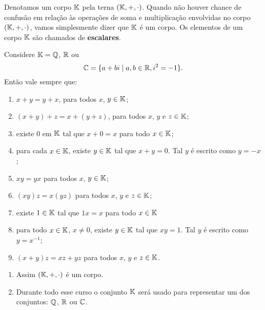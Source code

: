 \documentclass{beamer}
\begin{document}
    \begin{frame}
        Denotamos um corpo $\mathbb{K}$ pela terna $(\mathbb{K}, +, \cdot)$. Quando n\~ao houver chance de confus\~ao em rela\c{c}\~ao \`as opera\c{c}\~oes de soma e multiplica\c{c}\~ao envolvidas no corpo $(\mathbb{K}, +, \cdot)$, vamos simplesmente dizer que $\mathbb{K}$ \'e um corpo. Os elementos de um corpo $\mathbb{K}$ s\~ao chamados de \textbf{escalares}.
    \end{frame}
    
    \begin{frame}
    
        Considere $\mathbb{K} = \mathbb{Q}$, $\mathbb{R}$ ou
        \[
    	    \mathbb{C} = \{a + bi \mid a, b \in \mathbb{R}, i^2 = -1\}.
        \]
        Então vale sempre que:

        \begin{enumerate}[label={\roman*})]
	    \item $x + y = y + x$, para todos $x$, $y \in \mathbb{K}$;
            \item $(x + y) + z = x + (y + z)$, para todos $x$, $y$ e $z \in \mathbb{K}$;
            \item existe $0$ em $\mathbb{K}$ tal que $x + 0 = x$ para todo $x \in \mathbb{K}$;
            \item para cada $x \in \mathbb{K}$, existe $y \in \mathbb{K}$ tal que $x + y = 0$. Tal $y$ é escrito como $y = -x$;
            \item $xy = yx$ para todos $x$, $y \in \mathbb{K}$;
            \item $(xy)z = x(yz)$ para todos $x$, $y$ e $z \in \mathbb{K}$;
            \item existe $1 \in \mathbb{K}$ tal que $1x = x$ para todo $x \in \mathbb{K}$
            \item para todo $x \in \mathbb{K}$, $x \ne 0$, existe $y \in \mathbb{K}$ tal que $xy =1$. Tal $y$ é escrito como $y = x^{-1}$;
            \item $(x + y)z = xz + yz$ para todos $x$, $y$ e $z \in \mathbb{K}$.
        \end{enumerate}
    \end{frame}
    
    \begin{frame}
        \begin{enumerate}[label={\roman*})]
            \item Assim $(\mathbb{K}, +, \cdot)$ é um corpo.

            \item Durante todo esse curso o conjunto $\mathbb{K}$ será usado para representar um dos conjuntos: $\mathbb{Q}$, $\mathbb{R}$ ou $\mathbb{C}$.
        \end{enumerate}
    \end{frame}
\end{document}
